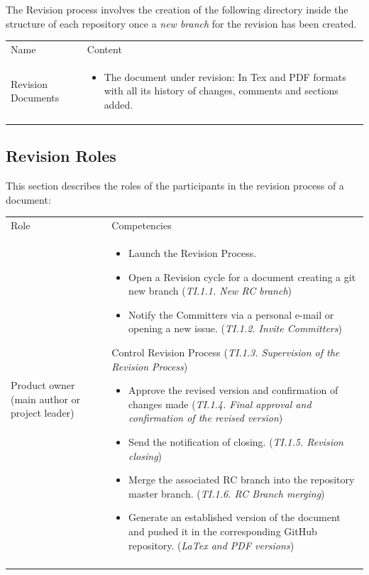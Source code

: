 \documentclass{template/openetcs_article}
\begin{document}
The Revision process involves the creation of the following directory inside the structure of each repository once a {\it new branch} for the revision has been created.

\begin{flushleft}
\begin{tabular}{|m{3cm}|m{11cm}|}
\hline
\rowcolor{myblue}
\multicolumn{2}{|c|}{Structure of the repository} \\\hline
\rowcolor{lightgray}
Name &
Content 
\\\hline
Revision Documents &
\begin{itemize}
\item The document under revision: In Tex and PDF formats with all its history of changes, comments and sections added.
\end{itemize}\\\hline
\end{tabular}
\end{flushleft}

\subsection{Revision Roles}

This section describes the roles of the participants in the revision process of a document:

\begin{flushleft}
\begin{tabular}{|m{3cm}|m{11cm}|}
\hline
\rowcolor{myblue}
\multicolumn{2}{|c|}{Roles} \\\hline
\rowcolor{lightgray}
Role &
Competencies \\\hline
Product owner (main author or project leader) &
\begin{itemize}
\item Launch the Revision Process.
\item Open a Revision cycle for a document creating a git new branch ({\it TI.1.1. New RC branch}) 
\item Notify the Committers via a personal e-mail or opening a new issue.  ({\it TI.1.2. Invite Committers})
\end{itemize}
\item Control Revision Process ({\it TI.1.3. Supervision of the Revision Process})
\begin{itemize}
\item Approve the revised version and confirmation of changes made ({\it TI.1.4. Final approval and confirmation of the revised version})
\item Send the notification of closing. ({\it TI.1.5. Revision closing})
\item Merge the associated RC branch into the repository master branch. ({\it TI.1.6. RC Branch merging})
\item Generate an established version of the document and pushed it in the corresponding GitHub repository. ({\it LaTex and PDF versions})
\end{itemize}
\\\\\hline
\end{tabular}
\end{flushleft}
\end{document}

